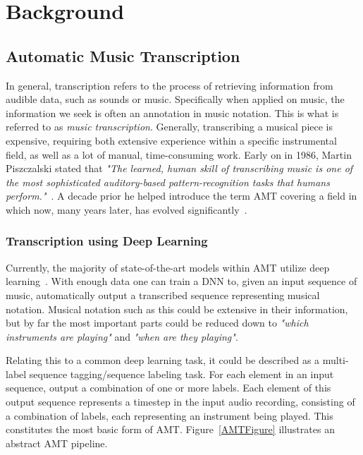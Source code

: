 \chapter{Background}\label{Background}

\section{Automatic Music Transcription}

In general, transcription refers to the process of retrieving information from audible data, such as sounds or music. Specifically when applied on music, the information we seek is often an annotation in music notation. This is what is referred to as \textit{music transcription}. Generally, transcribing a musical piece is expensive, requiring both extensive experience within a specific instrumental field, as well as a lot of manual, time-consuming work. Early on in 1986, Martin Piszczalski stated that \textit{"The learned, human skill of transcribing music is one of the most sophisticated auditory-based pattern-recognition tasks that humans perform."}~\cite{10.5555/15202}. A decade prior he helped introduce the term \acrfull{AMT} covering a field in which now, many years later, has evolved significantly~\cite{piszczalski1977automatic}.

\subsection{Transcription using Deep Learning}
Currently, the majority of state-of-the-art models within \gls{AMT} utilize deep learning~\cite{8350302, signals4040042, jamshidi2024machine}. With enough data one can train a \gls{DNN} to, given an input sequence of music, automatically output a transcribed sequence representing musical notation. Musical notation such as this could be extensive in their information, but by far the most important parts could be reduced down to \textit{"which instruments are playing"} and \textit{"when are they playing"}.

Relating this to a common deep learning task, it could be described as a multi-label sequence tagging/sequence labeling task. For each element in an input sequence, output a combination of one or more labels. Each element of this output sequence represents a timestep in the input audio recording, consisting of a combination of labels, each representing an instrument being played. This constitutes the most basic form of \gls{AMT}. Figure~\ref{AMTFigure} illustrates an abstract \gls{AMT} pipeline.

